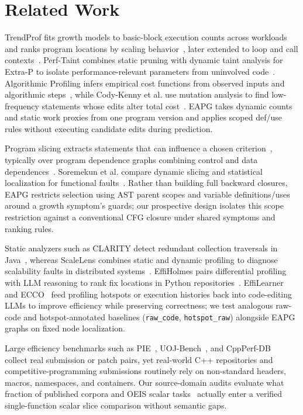 \section{Related Work}
\label{sec:related-work}

TrendProf fits growth models to basic-block execution counts across workloads and ranks program locations by scaling behavior~\cite{goldsmith2007measuring}, later extended to loop and call contexts~\cite{goldsmith2009measuring}. Perf-Taint combines static pruning with dynamic taint analysis for Extra-P to isolate performance-relevant parameters from uninvolved code~\cite{copik2021extrap}. Algorithmic Profiling infers empirical cost functions from observed inputs and algorithmic steps~\cite{zaparanuks2012algorithmic}, while Cody-Kenny et al. use mutation analysis to find low-frequency statements whose edits alter total cost~\cite{codykenny2018performance}. EAPG takes dynamic counts and static work proxies from one program version and applies scoped def/use rules without executing candidate edits during prediction.

Program slicing extracts statements that can influence a chosen criterion~\cite{weiser1981slicing}, typically over program dependence graphs combining control and data dependences~\cite{ferrante1987program}. Soremekun et al. compare dynamic slicing and statistical localization for functional faults~\cite{soremekun2021locating}. Rather than building full backward closures, EAPG restricts selection using AST parent scopes and variable definitions/uses around a growth symptom's guards; our prospective design isolates this scope restriction against a conventional CFG closure under shared symptoms and ranking rules.

Static analyzers such as CLARITY detect redundant collection traversals in Java~\cite{olivo2015static}, whereas ScaleLens combines static and dynamic profiling to diagnose scalability faults in distributed systems~\cite{zhu2026understanding}. EffiHolmes pairs differential profiling with LLM reasoning to rank fix locations in Python repositories~\cite{yang2026effiholmes}. EffiLearner~\cite{huang2024effilearner} and ECCO~\cite{waghjale2024ecco} feed profiling hotspots or execution histories back into code-editing LLMs to improve efficiency while preserving correctness; we test analogous raw-code and hotspot-annotated baselines (\texttt{raw\_code}, \texttt{hotspot\_raw}) alongside EAPG graphs on fixed node localization.

Large efficiency benchmarks such as PIE~\cite{shypula2024pie}, UOJ-Bench~\cite{xu2026uoj}, and CppPerf-DB~\cite{ho2026cppperf} collect real submission or patch pairs, yet real-world C++ repositories and competitive-programming submissions routinely rely on non-standard headers, macros, namespaces, and containers. Our source-domain audits evaluate what fraction of published corpora and OEIS scalar tasks~\cite{oeis2026} actually enter a verified single-function scalar slice comparison without semantic gaps.
